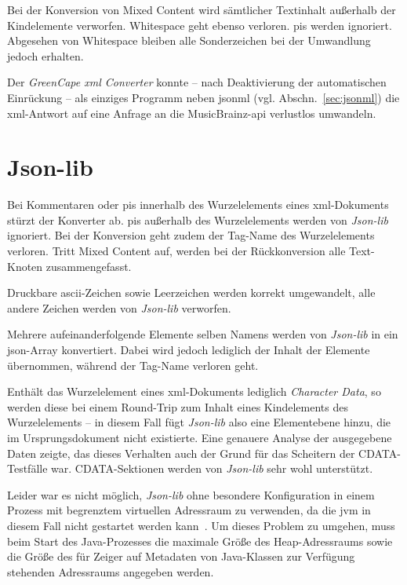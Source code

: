 Bei der Konversion von Mixed Content wird sämtlicher Textinhalt außerhalb der Kindelemente verworfen. Whitespace geht ebenso verloren. \glspl{pi} werden ignoriert. Abgesehen von Whitespace bleiben alle Sonderzeichen bei der Umwandlung jedoch erhalten.

Der \emph{GreenCape \acrshort{xml} Converter} konnte -- nach Deaktivierung der automatischen Einrückung -- als einziges Programm neben \acrshort{jsonml} (vgl. Abschn.~\ref{sec:jsonml}) die \acrshort{xml}-Antwort auf eine Anfrage an die MusicBrainz-\acrshort{api} verlustlos umwandeln.

\section{Json-lib}
\label{sec:jsonlib}

Bei Kommentaren oder \glspl{pi} innerhalb des Wurzelelements eines \acrshort{xml}-Dokuments stürzt der Konverter ab. \glspl{pi} außerhalb des Wurzelelements werden von \emph{Json-lib} ignoriert. Bei der Konversion geht zudem der Tag-Name des Wurzelelements verloren. Tritt Mixed Content auf, werden bei der Rückkonversion alle Text-Knoten zusammengefasst.

Druckbare \acrshort{ascii}-Zeichen sowie Leerzeichen werden korrekt umgewandelt, alle andere Zeichen werden von \emph{Json-lib} verworfen.

Mehrere aufeinanderfolgende Elemente selben Namens werden von \emph{Json-lib} in ein \acrshort{json}-Array konvertiert. Dabei wird jedoch lediglich der Inhalt der Elemente übernommen, während der Tag-Name verloren geht.

Enthält das Wurzelelement eines \acrshort{xml}-Dokuments lediglich \emph{Character Data}, so werden diese bei einem Round-Trip zum Inhalt eines Kindelements des Wurzelelements -- in diesem Fall fügt \emph{Json-lib} also eine Elementebene hinzu, die im Ursprungsdokument nicht existierte. Eine genauere Analyse der ausgegebene Daten zeigte, das dieses Verhalten auch der Grund für das Scheitern der CDATA-Testfälle war. CDATA-Sektionen werden von \emph{Json-lib} sehr wohl unterstützt.

Leider war es nicht möglich, \emph{Json-lib} ohne besondere Konfiguration in einem Prozess mit begrenztem virtuellen Adressraum zu verwenden, da die \acrfull{jvm} in diesem Fall nicht gestartet werden kann~\cite{jvmmemlimit}. Um dieses Problem zu umgehen, muss beim Start des Java-Prozesses die maximale Größe des Heap-Adressraums sowie die Größe des für Zeiger auf Metadaten von Java-Klassen zur Verfügung stehenden Adressraums angegeben werden.


